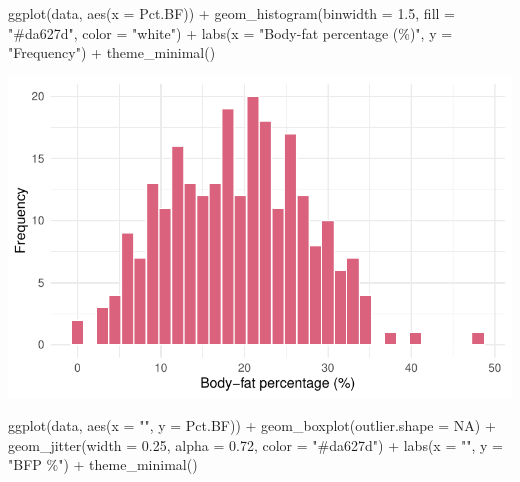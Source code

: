 \documentclass[
  letterpaper,
  DIV=11,
  numbers=noendperiod]{scrartcl}
\newenvironment{Shaded}{\begin{snugshade}}{\end{snugshade}}
\newcommand{\AttributeTok}[1]{\textcolor[rgb]{0.40,0.45,0.13}{#1}}
\newcommand{\ConstantTok}[1]{\textcolor[rgb]{0.56,0.35,0.01}{#1}}
\newcommand{\FloatTok}[1]{\textcolor[rgb]{0.68,0.00,0.00}{#1}}
\newcommand{\FunctionTok}[1]{\textcolor[rgb]{0.28,0.35,0.67}{#1}}
\newcommand{\NormalTok}[1]{\textcolor[rgb]{0.00,0.23,0.31}{#1}}
\newcommand{\SpecialCharTok}[1]{\textcolor[rgb]{0.37,0.37,0.37}{#1}}
\newcommand{\StringTok}[1]{\textcolor[rgb]{0.13,0.47,0.30}{#1}}
\begin{document}
\begin{Shaded}
\begin{Highlighting}[]
\FunctionTok{ggplot}\NormalTok{(data, }\FunctionTok{aes}\NormalTok{(}\AttributeTok{x =}\NormalTok{ Pct.BF)) }\SpecialCharTok{+}
  \FunctionTok{geom\_histogram}\NormalTok{(}\AttributeTok{binwidth =} \FloatTok{1.5}\NormalTok{, }\AttributeTok{fill =} \StringTok{"\#da627d"}\NormalTok{, }\AttributeTok{color =} \StringTok{"white"}\NormalTok{) }\SpecialCharTok{+}
  \FunctionTok{labs}\NormalTok{(}\AttributeTok{x =} \StringTok{"Body{-}fat percentage (\%)"}\NormalTok{, }\AttributeTok{y =} \StringTok{"Frequency"}\NormalTok{) }\SpecialCharTok{+}
  \FunctionTok{theme\_minimal}\NormalTok{()}
\end{Highlighting}
\end{Shaded}

\includegraphics{Untitled_files/figure-pdf/unnamed-chunk-4-1.pdf}

\begin{Shaded}
\begin{Highlighting}[]
\FunctionTok{ggplot}\NormalTok{(data, }\FunctionTok{aes}\NormalTok{(}\AttributeTok{x =} \StringTok{""}\NormalTok{, }\AttributeTok{y =}\NormalTok{ Pct.BF)) }\SpecialCharTok{+}
  \FunctionTok{geom\_boxplot}\NormalTok{(}\AttributeTok{outlier.shape =} \ConstantTok{NA}\NormalTok{) }\SpecialCharTok{+}
  \FunctionTok{geom\_jitter}\NormalTok{(}\AttributeTok{width =} \FloatTok{0.25}\NormalTok{, }\AttributeTok{alpha =} \FloatTok{0.72}\NormalTok{, }\AttributeTok{color =} \StringTok{"\#da627d"}\NormalTok{) }\SpecialCharTok{+}
  \FunctionTok{labs}\NormalTok{(}\AttributeTok{x =} \StringTok{""}\NormalTok{, }\AttributeTok{y =} \StringTok{"BFP \%"}\NormalTok{) }\SpecialCharTok{+}
  \FunctionTok{theme\_minimal}\NormalTok{()}
\end{Highlighting}
\end{Shaded}
\end{document}
